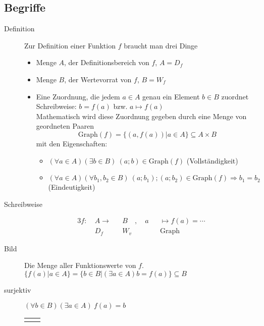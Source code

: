 \documentclass[12pt,a4paper]{article}
\begin{document}
\subsection{Begriffe}
\begin{description}
	\item[Definition] Zur Definition einer Funktion $f$ braucht man drei Dinge
		\begin{itemize}
			\item Menge $A$, der Definitionsbereich von $f$, $A = D_f$
			\item Menge $B$, der Wertevorrat von $f$, $B = W_f$
			\item Eine Zuordnung, die jedem $a \in A$ genau ein Element $b \in B$ zuordnet \\
			      Schreibweise: $b = f(a)$ bzw. $a \longmapsto f(a)$ \\
			      Mathematisch wird diese Zuordnung gegeben durch eine Menge von geordneten Paaren
			      $$\textrm{Graph}(f) = \lbrace(a,f(a)) | a \in A \rbrace \subseteq A \times B$$
			      mit den Eigenschaften:
			      \begin{itemize}
				      \item $(\forall a \in A)(\exists b \in B)\ (a;b) \in \textrm{Graph}(f)$ (Vollständigkeit)
				      \item $(\forall a \in A)(\forall b_1,b_2 \in B)\ (a;b_1);(a;b_2) \in \textrm{Graph}(f)\Rightarrow b_1 = b_2$ (Eindeutigkeit)
			      \end{itemize}
		\end{itemize}
	\item[Schreibweise]
		\begin{alignat*}{3}
			f :\  & A \longrightarrow &  & B \quad , \quad a &  & \longmapsto f(a) = \cdots \\
			      & D_f               &  & W_v               &  & \textrm{Graph}
		\end{alignat*}
	\item[Bild] Die Menge aller Funktionswerte von $f$. $\lbrace f(a) | a \in A \rbrace = \lbrace b \in B  | (\exists a \in A) b = f(a) \rbrace \subseteq B$
	\item[surjektiv] $(\forall b \in B)(\exists a \in A) \ f(a) = b$ \\
		\begin{tabularx}{\linewidth}{l|X}
			\adjustbox{valign = t}{
				\begin{tikzpicture}[thick, set/.style = {ellipse, minimum width = 2cm, minimum height = 4cm, draw = black, align = center}, element/.style = {circle, draw = black, minimum size = 0.7, outer sep = 0.05cm}]

\end{tikzpicture}}
\end{tabularx}
\end{description}
\end{document}
